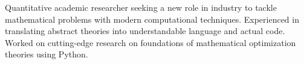 \documentclass[letter,10pt]{article}
\begin{document}


Quantitative academic researcher seeking a new role in industry to tackle mathematical problems with modern computational techniques. Experienced in translating abstract theories into understandable language and actual code. Worked on cutting-edge research on foundations of mathematical optimization theories using Python. 
\end{document}
